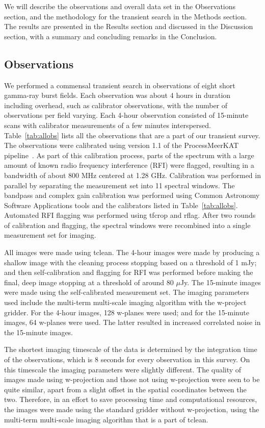\documentclass[12pt]{article}
\begin{document}
We will describe the observations and overall data set in the Observations section, and the methodology for the transient search in the Methods section. The results are presented in the Results section and discussed in the Discussion section, with a summary and concluding remarks in the Conclusion.

\subsection{Observations}

We performed a commensal transient search in observations of eight short gamma-ray burst fields. Each observation was about 4 hours in duration including overhead, such as calibrator observations, with the number of observations per field varying. Each 4-hour observation consisted of 15-minute scans with calibrator measurements of a few minutes interspersed. Table~\ref{tab:allobs} lists all the observations that are a part of our transient survey. The observations were calibrated using version 1.1 of the ProcessMeerKAT pipeline~\citep[{\sc ProcessMeerKAT};][]{pminprep}. As part of this calibration process, parts of the spectrum with a large amount of known radio frequency interference (RFI) were flagged, resulting in a bandwidth of about 800 MHz centered at 1.28 GHz. Calibration was performed in parallel by separating the measurement set into 11 spectral windows. The bandpass and complex gain calibration was performed using Common Astronomy Software Applications \citep[{\sc CASA;}][]{2022arXiv221002276T} tools and the calibrators listed in Table~\ref{tab:allobs}. Automated RFI flagging was performed using tfcrop and rflag. After two rounds of calibration and flagging, the spectral windows were recombined into a single measurement set for imaging. 

All images were made using tclean. The 4-hour images were made by producing a shallow image with the cleaning process stopping based on a threshold of 1 mJy; and then self-calibration and flagging for RFI was performed before making the final, deep image stopping at a threshold of around 80 $\mu$Jy. The 15-minute images were made using the self-calibrated measurement set. The imaging parameters used include the multi-term multi-scale imaging algorithm with the w-project gridder. For the 4-hour images, 128 w-planes were used; and for the 15-minute images, 64 w-planes were used. The latter resulted in increased correlated noise in the 15-minute images. 

The shortest imaging timescale of the data is determined by the integration time of the observations, which is 8 seconds for every observation in this survey. On this timescale the imaging parameters were slightly different. The quality of images made using w-projection and those not using w-projection were seen to be quite similar, apart from a slight offset in the spatial coordinates between the two. Therefore, in an effort to save processing time and computational resources, the images were made using the standard gridder without w-projection, using the multi-term multi-scale imaging algorithm that is a part of tclean.
\end{document}
